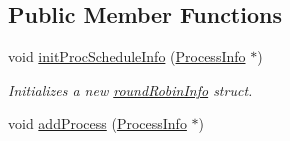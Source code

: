 \subsection*{\-Public \-Member \-Functions}
\begin{DoxyCompactItemize}
\item 
\hypertarget{classcRoundRobin_aadb221df9b12f61c3151996ea5c09741}{void \hyperlink{classcRoundRobin_aadb221df9b12f61c3151996ea5c09741}{init\-Proc\-Schedule\-Info} (\hyperlink{structProcessInfo}{\-Process\-Info} $\ast$)}\label{dc/dcc/classcRoundRobin_aadb221df9b12f61c3151996ea5c09741}

\begin{DoxyCompactList}\small\item\em \-Initializes a new \hyperlink{structroundRobinInfo}{round\-Robin\-Info} struct. \end{DoxyCompactList}\item 
\hypertarget{classcRoundRobin_a3571d05a8daebccb758d63b8327f8a22}{void \hyperlink{classcRoundRobin_a3571d05a8daebccb758d63b8327f8a22}{add\-Process} (\hyperlink{structProcessInfo}{\-Process\-Info} $\ast$)}\label{dc/dcc/classcRoundRobin_a3571d05a8daebccb758d63b8327f8a22}


\end{DoxyCompactItemize}

